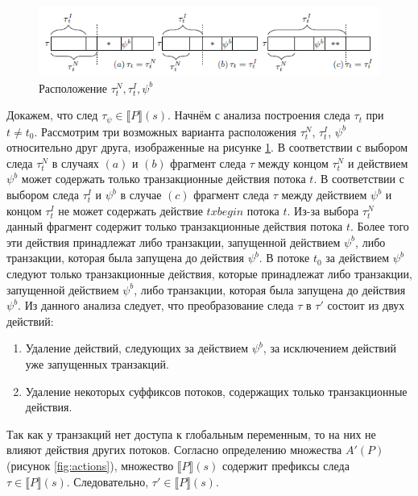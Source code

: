 \begin{myproof}
\begin{figure}
\centering
\includegraphics[width=\textwidth]{img/cases.png}
\caption{\label{fig:cases} Расположение $\tau^N_t, \tau^I_t, \psi^b$} 
\end{figure}
Докажем, что след $\tau_{\psi} \in \llbracket P \rrbracket (s)$. Начнём с анализа построения следа $\tau_t$ при $t \neq t_0$. Рассмотрим три возможных варианта расположения $\tau^N_t$, $\tau^I_t$, $\psi^b$ относительно друг друга, изображенные на рисунке \ref{fig:cases}. В соответствии с выбором следа $\tau^N_t$ в случаях $(a)$ и $(b)$ фрагмент следа $\tau$ между концом $\tau^N_t$ и действием $\psi^b$ может содержать только транзакционные действия потока $t$. В соответствии с выбором следа $\tau^I_t$ и $\psi^b$ в случае $(c)$ фрагмент следа $\tau$ между действием $\psi^b$ и концом $\tau^I_t$ не может содержать действие $txbegin$ потока $t$. Из-за выбора $\tau^N_t$ данный фрагмент содержит только транзакционные действия потока $t$. Более того эти действия принадлежат либо транзакции, запущенной действием $\psi^b$, либо транзакции, которая была запущена до действия $\psi^b$. В потоке $t_0$ за действием $\psi^b$ следуют только транзакционные действия, которые принадлежат либо транзакции, запущенной действием $\psi^b$, либо транзакции, которая была запущена до действия $\psi^b$. Из данного анализа следует, что преобразование следа $\tau$ в $\tau'$ состоит из двух действий:
\begin{enumerate}[label=(\roman*)]
\item Удаление действий, следующих за действием $\psi^b$, за исключением действий уже запущенных транзакций.
\item Удаление некоторых суффиксов потоков, содержащих только транзакционные действия. 
\end{enumerate}
Так как у транзакций нет доступа к глобальным переменным, то на них не влияют действия других потоков. Согласно определению множества $A'(P)$ (рисунок \ref{fig:actions}), множество $\llbracket P\rrbracket(s)$ содержит префиксы следа $\tau \in \llbracket P\rrbracket(s)$. Следовательно, $\tau' \in \llbracket P\rrbracket(s)$.


\end{myproof}
